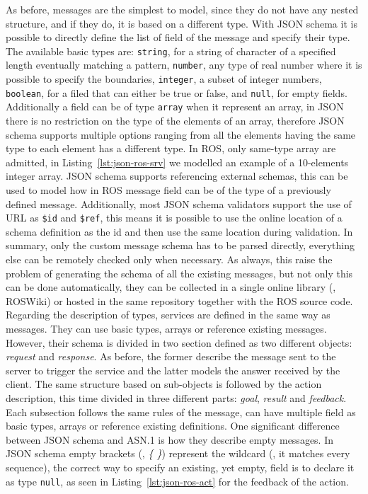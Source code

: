 As before, messages are the simplest to model, since they do not have any nested structure, and if they do, it is based on a different type. With JSON schema it is possible to directly define the list of field of the message and specify their type. The available basic types are: \texttt{string}, for a string of character of a specified length eventually matching a pattern, \texttt{number}, any type of real number where it is possible to specify the boundaries, \texttt{integer}, a subset of integer numbers, \texttt{boolean}, for a filed that can either be true or false, and \texttt{null}, for empty fields. Additionally a field can be of type \texttt{array} when it represent an array, in JSON there is no restriction on the type of the elements of an array, therefore JSON schema supports multiple options ranging from all the elements having the same type to each element has a different type. In ROS, only same-type array are admitted, in Listing~\ref{lst:json-ros-srv} we modelled an example of a 10-elements integer array. JSON schema supports referencing external schemas, this can be used to model how in ROS message field can be of the type of a previously defined message. Additionally, most JSON schema validators support the use of URL as \texttt{\$id} and \texttt{\$ref}, this means it is possible to use the online location of a schema definition as the id and then use the same location during validation. In summary, only the custom message schema has to be parsed directly, everything else can be remotely checked only when necessary. As always, this raise the problem of generating the schema of all the existing messages, but not only this can be done automatically, they can be collected in a single online library (\eg, ROSWiki) or hosted in the same repository together with the ROS source code. Regarding the description of types, services are defined in the same way as messages. They can use basic types, arrays or reference existing messages. However, their schema is divided in two section defined as two different objects: \textit{request} and \textit{response}. As before, the former describe the message sent to the server to trigger the service and the latter models the answer received by the client. The same structure based on sub-objects is followed by the action description, this time divided in three different parts: \textit{goal}, \textit{result} and \textit{feedback}. Each subsection follows the same rules of the message, can have multiple field as basic types, arrays or reference existing definitions. One significant difference between JSON schema and ASN.1 is how they describe empty messages. In JSON schema empty brackets (\ie, \textit{\{ \}}) represent the wildcard (\ie, it matches every sequence), the correct way to specify an existing, yet empty, field is to declare it as type \texttt{null}, as seen in Listing~\ref{lst:json-ros-act} for the feedback of the action.

